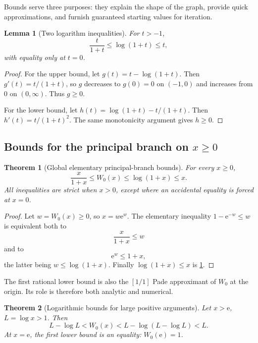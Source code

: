 \documentclass[11pt]{article}
\newtheorem{theorem}{Theorem}[section]
\newtheorem{lemma}[lemma]{Lemma}
\theoremstyle{remark}
\newcommand{\Wz}{W_0}
\newcommand{\ee}{\mathrm e}
\begin{document}
Bounds serve three purposes: they explain the shape of the graph, provide
quick approximations, and furnish guaranteed starting values for iteration.

\begin{lemma}[Two logarithm inequalities]\label{lem:logineq}
For \(t>-1\),
\begin{equation}\label{eq:logineq}
       \frac{t}{1+t}\leq\log(1+t)\leq t,
\end{equation}
with equality only at \(t=0\).
\end{lemma}

\begin{proof}
For the upper bound, let \(g(t)=t-\log(1+t)\).  Then
\(g'(t)=t/(1+t)\), so \(g\) decreases to \(g(0)=0\) on \((-1,0)\) and
increases from \(0\) on \((0,\infty)\).  Thus \(g\geq0\).

For the lower bound, let
\(h(t)=\log(1+t)-t/(1+t)\).  Then
\(h'(t)=t/(1+t)^2\).  The same monotonicity argument gives \(h\geq0\).
\end{proof}

\subsection{Bounds for the principal branch on \texorpdfstring{\(x\geq0\)}{x >= 0}}

\begin{theorem}[Global elementary principal-branch bounds]\label{thm:W0positivebounds}
For every \(x\geq0\),
\begin{equation}\label{eq:W0positivebounds}
 \boxed{\displaystyle
 \frac{x}{1+x}\leq\Wz(x)\leq\log(1+x)\leq x.}
\end{equation}
All inequalities are strict when \(x>0\), except where an accidental equality
is forced at \(x=0\).
\end{theorem}

\begin{proof}
Let \(w=\Wz(x)\geq0\), so \(x=w\ee^w\).  The elementary inequality
\(1-\ee^{-w}\leq w\) is equivalent both to
\[
       \frac{x}{1+x}\leq w
\]
and to
\[
       \ee^w\leq1+x,
\]
the latter being \(w\leq\log(1+x)\).  Finally
\(\log(1+x)\leq x\) is \cref{lem:logineq}.
\end{proof}

The first rational lower bound is also the \([1/1]\) Pade approximant of
\(\Wz\) at the origin.  Its role is therefore both analytic and numerical.

\begin{theorem}[Logarithmic bounds for large positive arguments]\label{thm:W0logbounds}
Let \(x>\ee\), \(L=\log x>1\).  Then
\begin{equation}\label{eq:W0logbounds}
 L-\log L
 <\Wz(x)
 <L-\log(L-\log L)
 <L.
\end{equation}
At \(x=\ee\), the first lower bound is an equality:
\(\Wz(\ee)=1\).
\end{theorem}
\end{document}
